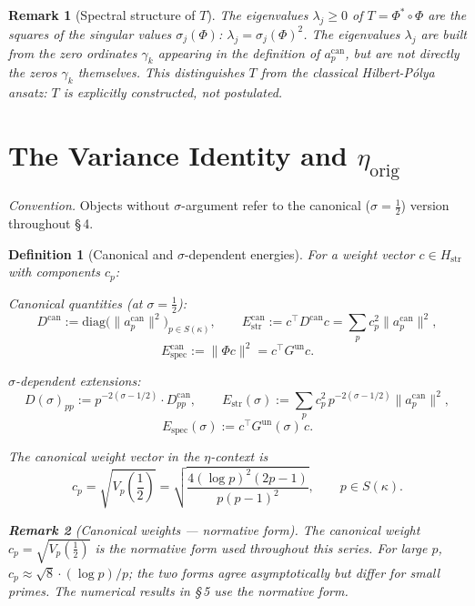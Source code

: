 \documentclass[11pt]{article}
\newtheorem{definition}[theorem]{Definition}
\newtheorem*{remark}{Remark}
\newcommand{\Hstr}{H_{\mathrm{str}}}
\newcommand{\Estr}{E_{\mathrm{str}}}
\newcommand{\Espec}{E_{\mathrm{spec}}}
\newcommand{\etaorig}{\eta_{\mathrm{orig}}}
\newcommand{\Gun}{G^{\mathrm{un}}}
\newcommand{\acan}{a_p^{\mathrm{can}}}
\newcommand{\Dcan}{D^{\mathrm{can}}}
\newcommand{\Estrcan}{\Estr^{\mathrm{can}}}
\newcommand{\Especcan}{\Espec^{\mathrm{can}}}
\begin{document}
\begin{remark}[Spectral structure of $T$]
The eigenvalues $\lambda_j\geq 0$ of $T=\Phi^*\circ\Phi$ are the squares of
the singular values $\sigma_j(\Phi)$: $\lambda_j=\sigma_j(\Phi)^2$.
The eigenvalues $\lambda_j$ are built from the zero ordinates $\gamma_k$
appearing in the definition of $\acan$, but are \emph{not} directly the zeros
$\gamma_k$ themselves. This distinguishes $T$ from the classical Hilbert-P\'olya
ansatz: $T$ is explicitly constructed, not postulated.
\end{remark}

\section{The Variance Identity and $\etaorig$}

\emph{Convention.} Objects without $\sigma$-argument refer to the canonical
($\sigma=\tfrac12$) version throughout \S\,4.

\begin{definition}[Canonical and $\sigma$-dependent energies]
\label{def:energies}
For a weight vector $c\in\Hstr$ with components $c_p$:

\emph{Canonical quantities} (at $\sigma=\tfrac12$):
\[
\Dcan:=\mathrm{diag}\!\bigl(\|\acan\|^2\bigr)_{p\in S(\kappa)},
\qquad
\Estrcan:=c^\top\Dcan c=\sum_p c_p^2\|\acan\|^2,
\]
\[
\Especcan:=\|\Phi c\|^2=c^\top\Gun c.
\]

\emph{$\sigma$-dependent extensions:}
\[
D(\sigma)_{pp}:=p^{-2(\sigma-1/2)}\cdot\Dcan_{pp},
\qquad
\Estr(\sigma):=\sum_p c_p^2\,p^{-2(\sigma-1/2)}\|\acan\|^2,
\]
\[
\Espec(\sigma):=c^\top\Gun(\sigma)\,c.
\]

The \emph{canonical weight vector} in the $\eta$-context is
\[
c_p = \sqrt{V_p({\textstyle\frac12})}
    = \sqrt{\frac{4(\log p)^2(2p-1)}{p(p-1)^2}},
    \qquad p \in S(\kappa).
\]
\begin{remark}[Canonical weights --- normative form]
The canonical weight $c_p = \sqrt{V_p(\frac{1}{2})}$
is the normative form used throughout this series. For large $p$,
$c_p \approx \sqrt{8}\cdot(\log p)/p$; the two forms
agree asymptotically but differ for small primes.
The numerical results in \S\,5 use the normative form.
\end{remark}
\end{definition}
\end{document}
